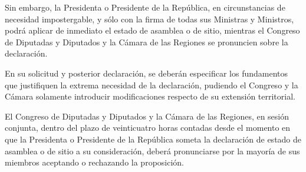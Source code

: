 \documentclass[11pt, a4paper]{article}
\begin{document}
\begin{enumerate}
Sin embargo, la Presidenta o Presidente de la República, en circunstancias de necesidad impostergable, y sólo con la firma de todas sus Ministras y Ministros, podrá aplicar de inmediato el estado de asamblea o de sitio, mientras el Congreso de Diputadas y Diputados y la Cámara de las Regiones se pronuncien sobre la declaración. 

En su solicitud y posterior declaración, se deberán especificar los fundamentos que justifiquen la extrema necesidad de la declaración, pudiendo el Congreso y la Cámara solamente introducir modificaciones respecto de su extensión territorial. 

El Congreso de Diputadas y Diputados y la Cámara de las Regiones, en sesión conjunta, dentro del plazo de veinticuatro horas contadas desde el momento en que la Presidenta o Presidente de la República someta la declaración de estado de asamblea o de sitio a su consideración, deberá pronunciarse por la mayoría de sus miembros aceptando o rechazando la proposición. 


\end{enumerate}
\end{document}
